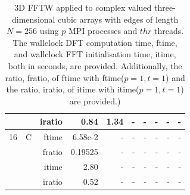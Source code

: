 \documentclass[a4paper]{article}
\begin{document}
\begin{table}[htbp]
\begin{center}
\begin{small}
\begin{tabular}{|r|r|r|r|r|r|r|r|r|r|}
             &             &  iratio &    0.84 &    1.34  &      - &      - &      - &      - &      - \\\hline
   16 &   C &  ftime &    6.58e-2 &      - &      - &      - &      - &      - &      - \\
             &             &  fratio &    0.19525 &      - &      - &      - &      - &      - &      - \\
             &             &  itime &    2.80  &      - &      - &      - &      - &      - &      - \\
             &             &  iratio &    0.52 &      - &      - &      - &      - &      - &      - \\\hline
\end{tabular}
\caption{3D FFTW applied to complex valued three-dimensional cubic arrays with edges of length $N=256$ using $p$ MPI processes and $thr$ threads. The wallclock DFT computation time, ftime, and wallclock FFT initialisation time, itime, both in seconds, are provided. Additionally, the ratio, fratio, of ftime  with ftime($p=1,t=1$) and the ratio, iratio, of itime  with itime($p=1,t=1$) are provided.) }\label{Tbl:FFTW3d256c}
\end{small}
\end{center}
\end{table}
\end{document}
